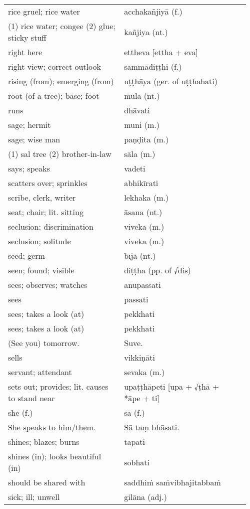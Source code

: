 \documentclass[a5paper]{memoir}
\begin{document}
\begin{longtable}{L{0.48\linewidth} L{0.48\linewidth} H}
rice gruel; rice water & acchakañjiyā (f.) & \\
(1) rice water; congee (2) glue; sticky stuff & kañjiya (nt.) & \\
right here & ettheva [ettha + eva] & \\
right view; correct outlook & sammādiṭṭhi (f.) & \\
rising (from); emerging (from) & uṭṭhāya (ger. of uṭṭhahati) & \\
root (of a tree); base; foot & mūla (nt.) & \\
runs & dhāvati & \\
sage; hermit & muni (m.) & \\
sage; wise man & paṇḍita (m.) & \\
(1) sal tree (2) brother-in-law & sāla (m.) & \\
says; speaks & vadeti & \\
scatters over; sprinkles & abhikīrati & \\
scribe, clerk, writer & lekhaka (m.) & \\
seat; chair; lit. sitting & āsana (nt.) & \\
seclusion; discrimination & viveka (m.) & \\
seclusion; solitude & viveka (m.) & \\
seed; germ & bīja (nt.) & \\
seen; found; visible & diṭṭha (pp. of √dis) & \\
sees; observes; watches & anupassati & \\
sees & passati & \\
sees; takes a look (at) & pekkhati & \\
sees; takes a look (at) & pekkhati & \\
(See you) tomorrow. & Suve. & \\
sells & vikkiṇāti & \\
servant; attendant & sevaka (m.) & \\
sets out; provides; lit. causes to stand near & upaṭṭhāpeti [upa + √ṭhā + *āpe + ti] & \\
she (f.) & sā (f.) & \\
She speaks to him/them. & Sā taṃ bhāsati. & \\
shines; blazes; burns & tapati & \\
shines (in); looks beautiful (in) & sobhati & \\
should be shared with & saddhiṁ saṁvibhajitabbaṁ & \\
sick; ill; unwell & gilāna (adj.) & \\

\end{longtable}
\end{document}
